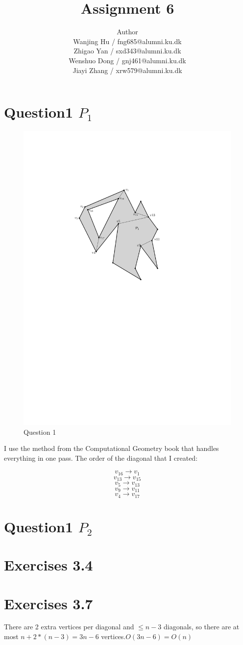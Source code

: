 \documentclass[12pt]{article}
\title{Assignment 6}
\author{Author \\
  Wanjing Hu / fng685@alumni.ku.dk  \\
  Zhigao Yan / sxd343@alumni.ku.dk  \\
  Wenshuo Dong / gnj461@alumni.ku.dk  \\
  Jiayi Zhang / xrw579@alumni.ku.dk \\
}
\begin{document}
\maketitle

\section{Question1 $P_1$}
\begin{figure}[h]
    \centering
    \includegraphics[width=0.5\linewidth]{triangulationExercise (2)-1.pdf}
    \caption{Question 1}
    \label{fig:enter-label}
\end{figure}
I use the method from the Computational Geometry book that handles everything in one pass.
The order of the diagonal that I created:

\[v_{16} \rightarrow v_1\]
\[v_{13} \rightarrow v_{15}\]
\[v_{5} \rightarrow v_{13}\]
\[v_{9} \rightarrow v_{11}\]
\[v_{4} \rightarrow v_{17}\]



\section{Question1 $P_2$}

\section{Exercises 3.4}

\section{Exercises 3.7}
There are 2 extra vertices  per diagonal and $\leq n-3$ diagonals, so there are at most  $n+2*(n-3)=3n-6$ vertices.$O(3n-6) = O(n)$
\end{document}
